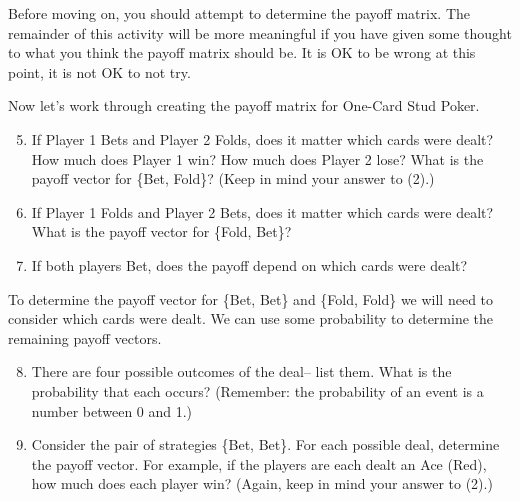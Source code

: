Before moving on, you should attempt to determine the payoff matrix. The remainder of this activity will be more meaningful if you have given some thought to what you think the payoff matrix should be. It is OK to be wrong at this point, it is not OK to not try. 
\vspace{.1in}

Now let's work through creating the payoff matrix for One-Card Stud Poker.
\vspace{.1in}

\begin{enumerate}
\setcounter{enumi}{4}

\item If Player 1 Bets and Player 2 Folds, does it matter which cards were dealt? How much does Player 1 win? How much does Player 2 lose? What is the payoff vector for \{Bet, Fold\}? (Keep in mind your answer to (2).)
\vspace{.1in}

\item If Player 1 Folds and Player 2 Bets, does it matter which cards were dealt? What is the payoff vector for \{Fold, Bet\}? 
\vspace{.1in}


\item If both players Bet, does the payoff depend on which cards were dealt?
\vspace{.1in}


\end{enumerate} 

To determine the payoff vector for \{Bet, Bet\} and \{Fold, Fold\} we will need to consider which cards were dealt. We can use some probability to determine the remaining payoff vectors.

\vspace{.1in}

\begin{enumerate}
\setcounter{enumi}{7}
\item There are four possible outcomes of the deal-- list them. What is the probability that each occurs? (Remember: the probability of an event is a number between 0 and 1.)

\vspace{.1in}

\item Consider the pair of strategies \{Bet, Bet\}. For each possible deal, determine the payoff vector. For example, if the players are each dealt an Ace (Red), how much does each player win? (Again, keep in mind your answer to (2).)

\vspace{.1in}

\end{enumerate}

